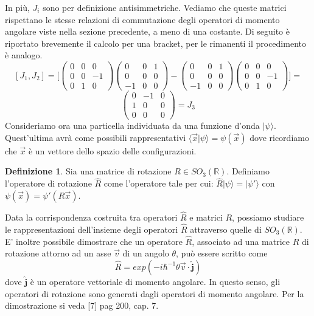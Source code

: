 \documentclass[12pt,a4paper]{report}
\theoremstyle{definition}
\newtheorem{Def}{Definizione}[chapter]
\theoremstyle{Theorem}
\theoremstyle{definition}
\theoremstyle{definition}
\theoremstyle{definition}
\begin{document}
In più, $J_i$ sono per definizione antisimmetriche.
Vediamo che queste matrici rispettano le stesse relazioni di commutazione degli operatori di momento angolare viste nella sezione precedente, a meno di una costante. Di seguito è riportato brevemente il calcolo per una bracket, per le rimanenti il procedimento è analogo.
$$[J_1,J_2]=\bigg[
\begin{pmatrix}
	0 &0&0\\
	0 &0&-1\\
	0 &1&0
\end{pmatrix}
\begin{pmatrix}
	0 &0&1\\
	0 &0&0\\
	-1 &0&0
\end{pmatrix}
-
\begin{pmatrix}
	0 &0&1\\
	0 &0&0\\
	-1 &0&0
\end{pmatrix}
\begin{pmatrix}
	0 &0&0\\
	0 &0&-1\\
	0 &1&0
\end{pmatrix}
\bigg]=$$
$$
\begin{pmatrix}
	0 &-1&0\\
	1 &0&0\\
	0 &0&0
\end{pmatrix}= J_3$$
Consideriamo ora una particella individuata da una funzione d'onda $|\psi\rangle$. Quest'ultima avrà come possibili rappresentativi $\langle \vec{x}|\psi\rangle=\psi(\vec{x})$ dove ricordiamo che $\vec{x}$ è un vettore dello spazio delle configurazioni.
\begin{Def}
	Sia una matrice di rotazione $R\in SO_3(\mathbb{R})$. Definiamo l'operatore di rotazione $\hat{R}$ come l'operatore tale per cui:
	$\hat{R}|\psi\rangle=|\psi'\rangle$ con $\psi(\vec{x})=\psi'(R\vec{x})$.
\end{Def}
Data la corrispondenza costruita tra operatori $\hat{R}$ e matrici $R$, possiamo studiare le rappresentazioni dell'insieme degli operatori $\hat{R}$ attraverso quelle di $SO_3(\mathbb{R})$. E' inoltre possibile dimostrare che un operatore $\hat{R}$, associato ad una matrice $R$ di rotazione attorno ad un asse $\vec{v}$ di un angolo $\theta$, può essere scritto come 
$$\hat{R}=exp(-i\hbar^{-1}\theta\vec{v}\cdot\hat{\textbf{j}})$$
dove $\hat{\textbf{j}}$ è un operatore vettoriale di momento angolare. In questo senso, gli operatori di rotazione sono generati dagli operatori di momento angolare. Per la dimostrazione si veda [7] pag 200, cap. 7.
\end{document}
